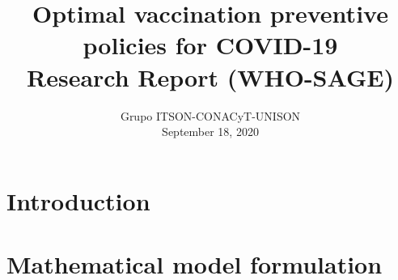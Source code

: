 \documentclass[preprint, sort&compress]{elsarticle}
\begin{document}
    \begin{frontmatter}
        \title{
            Optimal vaccination preventive policies for COVID-19\\
            \large{Research Report (WHO-SAGE)}
        }
        \author{%
            Grupo ITSON-CONACyT-UNISON\\
            September 18, 2020
        }%

	\end{frontmatter}

	\section{Introduction}
		
	\section{Mathematical model formulation}%
		
\end{document}
